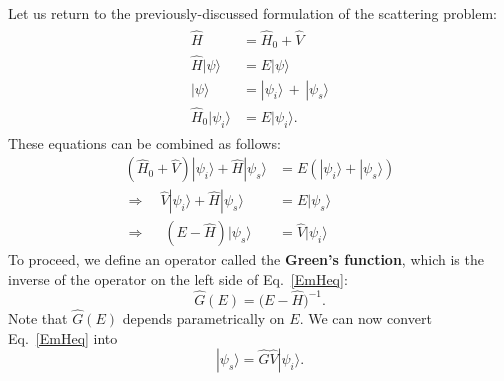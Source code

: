 \documentclass[pra,12pt]{revtex4-2}
\begin{document}
Let us return to the previously-discussed formulation of the
scattering problem:
\begin{align}
  \begin{aligned} \hat{H} &= \hat{H}_0+\hat{V} \\ \hat{H} |\psi\rangle &= E |\psi\rangle \\ |\psi\rangle &= |\psi_i\rangle \,+\, |\psi_s\rangle \\ \hat{H}_0 |\psi_i\rangle &= E |\psi_i\rangle.\end{aligned}
\end{align}
These equations can be combined as follows:
\begin{align}
  \left(\hat{H}_0 + \hat{V}\right) |\psi_i\rangle + \hat{H} |\psi_s\rangle &= E \left( |\psi_i\rangle + |\psi_s\rangle \right) \\
  \Rightarrow \quad \hat{V} |\psi_i\rangle + \hat{H} |\psi_s\rangle &= E |\psi_s\rangle  \\
  \Rightarrow \quad\; \left(E - \hat{H}\right) |\psi_s\rangle & = \hat{V} |\psi_i\rangle \label{EmHeq}
\end{align}
To proceed, we define an operator called the \textbf{Green's
  function}, which is the inverse of the operator on the left side of
Eq.~\eqref{EmHeq}:
\begin{equation}
  \hat{G}(E) = \big(E-\hat{H}\big)^{-1}.
  \label{Gdef}
\end{equation}
Note that $\hat{G}(E)$ depends parametrically on $E$.  We can now
convert Eq.~\eqref{EmHeq} into
\begin{equation}
  |\psi_s\rangle = \hat{G} \hat{V} |\psi_i\rangle.
  \label{scatterform}
\end{equation}
\end{document}
